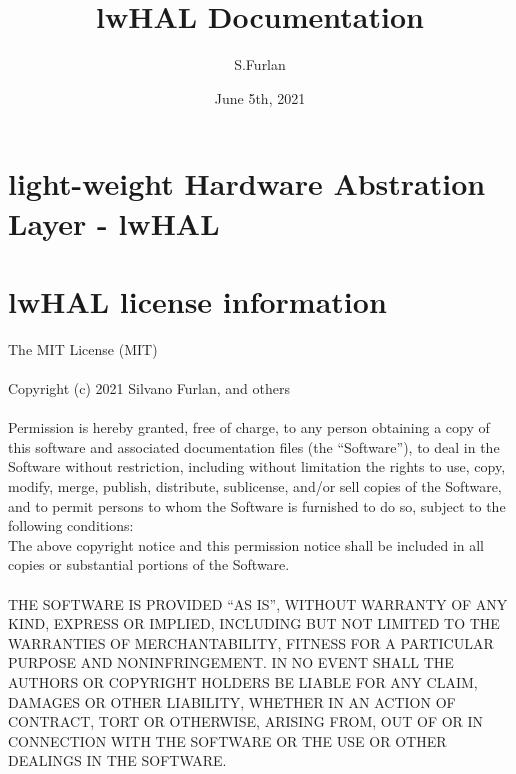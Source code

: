 \documentclass[letterpaper,10pt,english]{hitec}
\title{lwHAL Documentation}
\date{June 5th, 2021}
\author{S.Furlan}
\begin{document}
\maketitle
\blinddocument
\newpage

\tableofcontents

\newpage

\section{light-weight Hardware Abstration Layer - lwHAL}


\newpage

\section{lwHAL license information}

The MIT License (MIT)
\\
\\
Copyright (c) 2021 Silvano Furlan, and others
\\
\\
Permission is hereby granted, free of charge, to any person obtaining a copy
of this software and associated documentation files (the “Software”), to deal
in the Software without restriction, including without limitation the rights
to use, copy, modify, merge, publish, distribute, sublicense, and/or sell
copies of the Software, and to permit persons to whom the Software is
furnished to do so, subject to the following conditions:
\\
The above copyright notice and this permission notice shall be included in
all copies or substantial portions of the Software.
\\
\\
THE SOFTWARE IS PROVIDED “AS IS”, WITHOUT WARRANTY OF ANY KIND, EXPRESS OR
IMPLIED, INCLUDING BUT NOT LIMITED TO THE WARRANTIES OF MERCHANTABILITY,
FITNESS FOR A PARTICULAR PURPOSE AND NONINFRINGEMENT. IN NO EVENT SHALL THE
AUTHORS OR COPYRIGHT HOLDERS BE LIABLE FOR ANY CLAIM, DAMAGES OR OTHER
LIABILITY, WHETHER IN AN ACTION OF CONTRACT, TORT OR OTHERWISE, ARISING FROM,
OUT OF OR IN CONNECTION WITH THE SOFTWARE OR THE USE OR OTHER DEALINGS IN
THE SOFTWARE.
\end{document}
